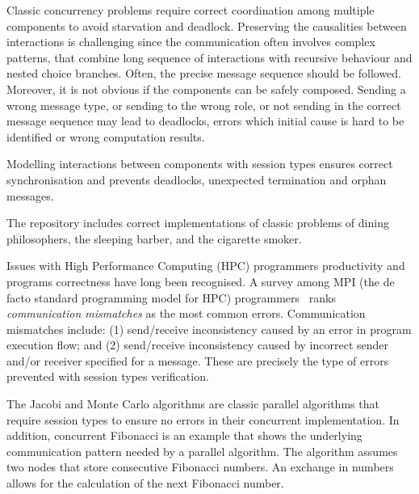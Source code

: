 Classic concurrency problems require correct coordination
among multiple components to avoid starvation and deadlock.
Preserving the causalities between interactions is
challenging since the communication often involves complex patterns,
that combine long sequence of interactions with recursive behaviour
and nested choice branches.
Often, the precise message sequence should be followed.
Moreover, it is not obvious if the components can be safely composed.
Sending a wrong message type, or sending to the wrong role,
or not sending in the correct message sequence may lead to deadlocks,
errors which initial cause is hard to be identified or wrong computation results.


Modelling interactions between components with session types ensures
correct synchronisation and prevents deadlocks,
unexpected termination and orphan messages.

The repository includes correct implementations of classic
problems of dining philosophers, the sleeping barber, and
the cigarette smoker.




Issues with High Performance Computing (HPC)
programmers productivity and programs correctness
have long been recognised.
A survey among MPI (the de facto standard programming model for HPC)
programmers~\cite{MPIErrors} ranks
\textit{communication mismatches} as the most common errors.
Communication mismatches include:
(1) send/receive inconsistency caused by an error in
program execution flow; and
(2) send/receive inconsistency caused by incorrect
sender and/or receiver specified for a message.
These are precisely the type of errors prevented with
session types verification.

The Jacobi and Monte Carlo algorithms are classic parallel algorithms
that require session types to ensure no errors in their
concurrent implementation.
%
In addition, concurrent Fibonacci is an
example that shows the underlying communication
pattern needed by a parallel algorithm.
The algorithm assumes two nodes that store
consecutive Fibonacci numbers. An exchange
in numbers allows for the calculation of the
next Fibonacci number.


